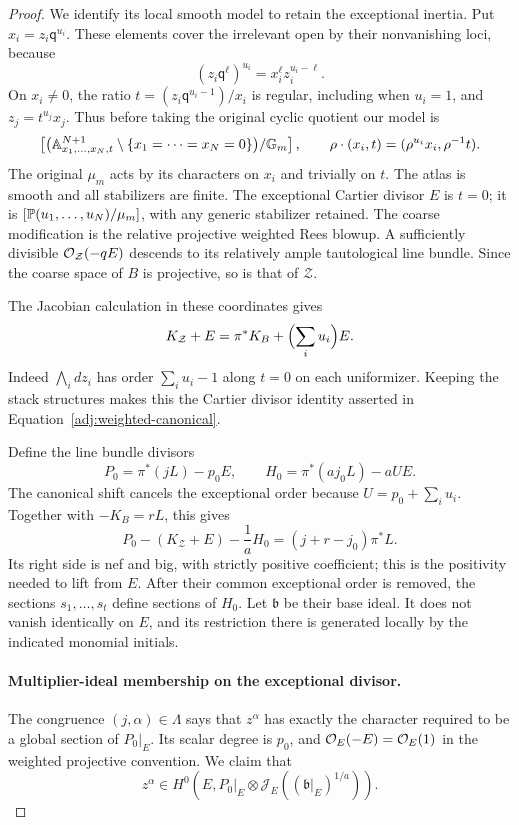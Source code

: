\begin{proof}
We identify its local smooth model to retain the exceptional inertia.
Put $x_i=z_i\mathsf q^{u_i}$.  These elements cover the irrelevant
open by their nonvanishing loci, because
\[
 (z_i\mathsf q^\ell)^{u_i}=x_i^\ell z_i^{u_i-\ell}.
\]
On $x_i\ne0$, the ratio
$t=(z_i\mathsf q^{u_i-1})/x_i$ is regular, including when $u_i=1$,
and $z_j=t^{u_j}x_j$.  Thus before taking the original cyclic quotient
our model is
\[
 \left[
  \bigl(\mathbb A^{N+1}_{x_1,\ldots,x_N,t}
       \setminus\{x_1=\cdots=x_N=0\}\bigr)/\mathbb G_m
 \right],
 \qquad
 \rho\cdot(x_i,t)=(\rho^{u_i}x_i,\rho^{-1}t).
\]
The original $\mu_m$ acts by its characters on $x_i$ and trivially
on $t$.  The atlas is smooth and all stabilizers are finite.
The exceptional Cartier divisor $E$ is $t=0$; it is
$[\mathbb P(u_1,\ldots,u_N)/\mu_m]$, with any generic stabilizer retained.
The coarse modification is the relative projective weighted Rees
blowup.  A sufficiently divisible $\mathcal O_{\mathcal Z}(-qE)$ descends
to its relatively ample tautological line bundle.  Since the coarse
space of $B$ is projective, so is that of $\mathcal Z$.

The Jacobian calculation in these coordinates gives
\begin{equation}\label{adj:weighted-canonical}
 K_{\mathcal Z}+E=\pi^*K_B+\Bigl(\sum_i u_i\Bigr)E.
\end{equation}
Indeed $\bigwedge_i dz_i$ has order $\sum_i u_i-1$ along $t=0$ on
each uniformizer.  Keeping the stack structures makes this the
Cartier divisor identity asserted in
Equation~\eqref{adj:weighted-canonical}.

Define the line bundle divisors
\[
 P_0=\pi^*(jL)-p_0E,
 \qquad H_0=\pi^*(aj_0L)-aUE.
\]
The canonical shift cancels the exceptional order because
$U=p_0+\sum_i u_i$.  Together with $-K_B=rL$, this gives
\begin{equation}\label{adj:positive-difference}
 P_0-(K_{\mathcal Z}+E)-\frac1aH_0
       =(j+r-j_0)\pi^*L.
\end{equation}
Its right side is nef and big, with strictly positive coefficient;
this is the positivity needed to lift from $E$.
After their common exceptional order is removed, the sections
$s_1,\ldots,s_t$ define sections of $H_0$.  Let $\mathfrak b$ be
their base ideal.  It does not vanish identically on $E$, and its
restriction there is generated locally by the indicated monomial
initials.

\paragraph{Multiplier-ideal membership on the exceptional divisor.}
The congruence $(j,\alpha)\in\Lambda$ says that $z^\alpha$ has
exactly the character required to be a global section of $P_0|_E$.
Its scalar degree is $p_0$, and $\mathcal O_E(-E)=\mathcal O_E(1)$ in the
weighted projective convention.  We claim that
\begin{equation}\label{adj:multiplier-membership}
 z^\alpha\in H^0\left(E,P_0|_E\otimes
                 \mathcal J_E((\mathfrak b|_E)^{1/a})\right).
\end{equation}


\end{proof}
